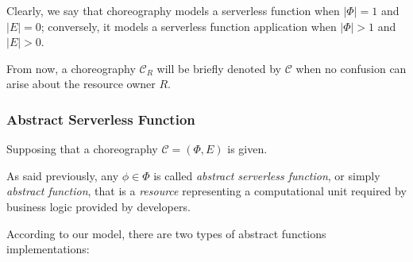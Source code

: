 \documentclass[12pt,a4paper]{report}
\theoremstyle{definition}
\begin{document}
Clearly, we say that choreography models a serverless function when $|\Phi| = 1$ and $|E| = 0$; conversely, it models a serverless function application when $|\Phi| > 1$ and $|E| > 0$.

From now, a choreography $\mathcal{C}_R$ will be briefly denoted by $\mathcal{C}$ when no confusion can arise about the resource owner $R$.

\subsubsection{Abstract Serverless Function}

Supposing that a choreography $\mathcal{C} = (\Phi,E)$ is given.

As said previously, any $\phi \in \Phi$ is called \textit{abstract serverless function}, or simply \textit{abstract function}, that is a \textit{resource} representing a computational unit required by business logic provided by developers.

According to our model, there are two types of abstract functions implementations:
\end{document}
